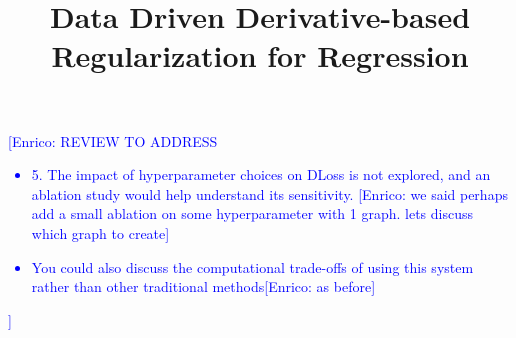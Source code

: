 \documentclass[conference]{IEEEtran}
\newcommand{\kibitz}[2]{\ifnum\Comments=1\textcolor{#1}{#2}\fi}
\newcommand{\enrico}[1]{\kibitz{blue} {[Enrico: #1]}}
\begin{document}
\title{Data Driven Derivative-based Regularization for Regression}

\author{

 

}

\maketitle

\enrico{REVIEW TO ADDRESS
\begin{itemize}
 \item 5. The impact of hyperparameter choices on DLoss is not explored, and an ablation study would help understand its sensitivity. \enrico{we said perhaps add a small ablation on some hyperparameter with 1 graph. lets discuss which graph to create}
 \item You could also discuss the computational trade-offs of using this system rather than other traditional methods\enrico{as before}
\end{itemize}
}
\end{document}
